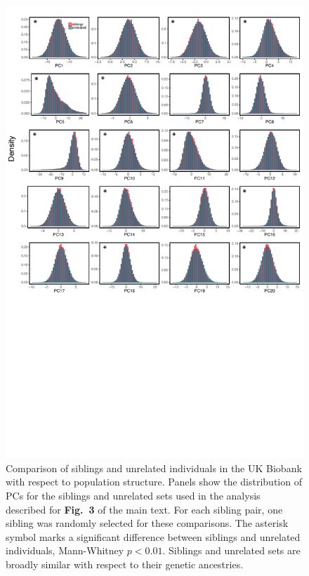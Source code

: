 \documentclass[hidelinks, 12pt]{article}
\begin{document}
\pagebreak

\begin{figure}[h]
\centering
\includegraphics[width=\textwidth]{./supp_figures/sibs_unrel_compare2.pdf}
\caption[Comparison of siblings and unrelated individuals in the UK Biobank with respect to population structure]{\small Comparison of siblings and unrelated individuals in the UK Biobank with respect to population structure. Panels show the distribution of PCs for the siblings and unrelated sets used in the analysis described for {\bf Fig.~3} of the main text. For each sibling pair, one sibling was randomly selected for these comparisons. The asterisk symbol marks a significant difference between siblings and unrelated individuals, Mann-Whitney $p<0.01$. Siblings and unrelated sets are broadly similar with respect to their genetic ancestries.}
\end{figure}
\end{document}

